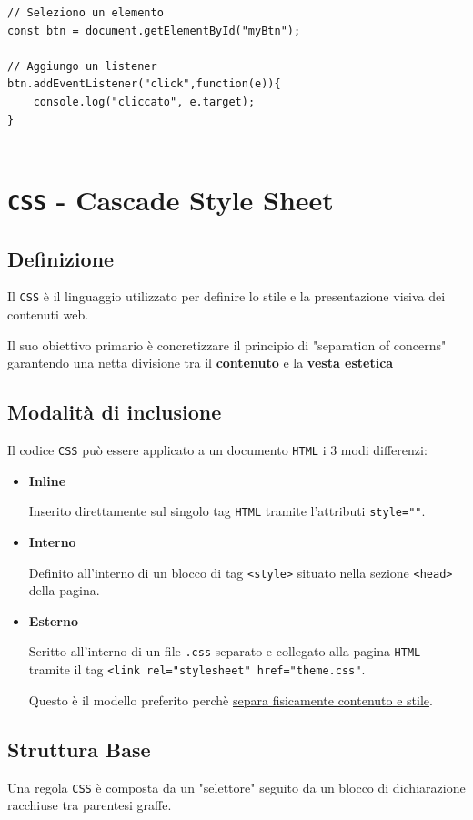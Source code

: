 \begin{lstlisting}[title=Esempio di codice]
// Seleziono un elemento
const btn = document.getElementById("myBtn");

// Aggiungo un listener
btn.addEventListener("click",function(e)){
    console.log("cliccato", e.target);
}
    
\end{lstlisting}

\chapter{\texttt{CSS} - Cascade Style Sheet}
\section{Definizione}
Il \texttt{CSS} è il linguaggio utilizzato per definire lo stile e la presentazione visiva dei contenuti web.

Il suo obiettivo primario è concretizzare il principio di "separation of concerns" garantendo una netta divisione tra il \textbf{contenuto} e la \textbf{vesta estetica}

\section{Modalità di inclusione}
Il codice \texttt{CSS} può essere applicato a un documento \texttt{HTML} i 3 modi differenzi:
\begin{itemize}
    \item \textbf{Inline}

    Inserito direttamente sul singolo tag \texttt{HTML} tramite l'attributi \texttt{style=""}.

    \item \textbf{Interno}

    Definito all'interno di un blocco di tag \texttt{<style>} situato nella sezione \texttt{<head>} della pagina.

    \item \textbf{Esterno}

    Scritto all'interno di un file \texttt{.css} separato e collegato alla pagina \texttt{HTML} tramite il tag \texttt{<link rel="stylesheet" href="theme.css"}.

    Questo è il modello preferito perchè \uline{separa fisicamente contenuto e stile}.
\end{itemize}

\newpage

\section{Struttura Base}
Una regola \texttt{CSS} è composta da un "selettore" seguito da un blocco di dichiarazione racchiuse tra parentesi graffe.

